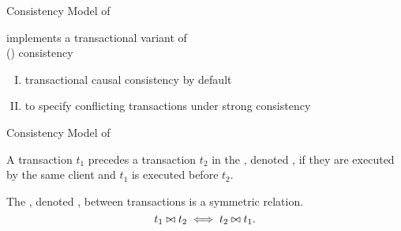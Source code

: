 \begin{frame}{Consistency Model of \unistore}
  \begin{center}
    \unistore{} implements a transactional variant of \\
     (\por) consistency~\purple{
      \footnotesize [Li@ACT'2018]}

    \vspace{0.60cm}
    \begin{enumerate}[(I)]
      \centering
      \item transactional causal consistency by default
      \item to specify conflicting transactions under strong consistency
    \end{enumerate}
  \end{center}
\end{frame}

\begin{frame}{Consistency Model of \unistore}
  \begin{definition}
    A transaction $t_{1}$ precedes a transaction $t_{2}$
    in the , denoted ,
    if they are executed by the same client and $t_{1}$ is executed before $t_{2}$.
  \end{definition}

  \vspace{0.60cm}
  \begin{definition}
    The , denoted \red{$\conflict$},
    between transactions is a symmetric relation.
    \[
      t_{1} \bowtie t_{2} \iff t_{2} \bowtie t_{1}.
    \]
  \end{definition}
\end{frame}

